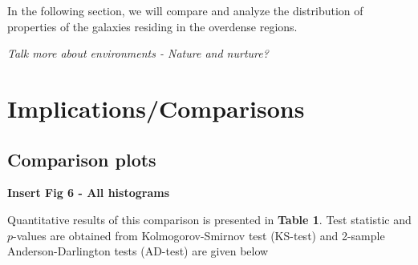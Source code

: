 \documentclass[twocolumn,useAMS,usenatbib]{mn2e}
\begin{document}
In the following section, we will compare and analyze the distribution of properties of the galaxies residing in the overdense regions.

%

\emph{Talk more about environments - Nature and nurture?}

\section{Implications/Comparisons}

\subsection{Comparison plots}
{\bf Insert Fig 6 - All histograms}

Quantitative results of this comparison is presented in {\bf Table 1}. Test statistic and $p$-values are obtained from Kolmogorov-Smirnov test (KS-test)
and 2-sample Anderson-Darlington tests (AD-test) are given below

\end{document}
